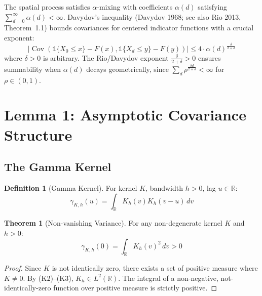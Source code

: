 \documentclass[final,3p,twocolumn,times,authoryear]{elsarticle}
\theoremstyle{definition}
\newtheorem{definition}{Definition}[section]
\newtheorem{theorem}{Theorem}[section]
\begin{document}
The spatial process satisfies $\alpha$-mixing with coefficients $\alpha(d)$ satisfying $\sum_{d=0}^\infty \alpha(d) < \infty$. Davydov's inequality (Davydov 1968; see also Rio 2013, Theorem~1.1) bounds covariances for centered indicator functions with a crucial exponent:
\begin{equation}
|\!\operatorname{Cov}(\mathbb{1}\{X_0 \leq x\} - F(x), \mathbb{1}\{X_d \leq y\} - F(y))\!| \leq 4 \cdot \alpha(d)^{\frac{\delta}{2+\delta}}
\end{equation}
where $\delta > 0$ is arbitrary. The Rio/Davydov exponent $\frac{\delta}{2+\delta} > 0$ ensures summability when $\alpha(d)$ decays geometrically, since $\sum_d \rho^{\frac{\delta d}{2+\delta}} < \infty$ for $\rho \in (0,1)$.

\section{Lemma 1: Asymptotic Covariance Structure}
\label{sec:lemma1}

\subsection{The Gamma Kernel}

\begin{definition}[Gamma Kernel]
\label{def:gamma-kernel}
For kernel $K$, bandwidth $h > 0$, lag $u \in \mathbb{R}$:
\begin{equation}
\gamma_{K,h}(u) = \int_{\mathbb{R}} K_h(v) K_h(v - u) \, dv
\end{equation}
\end{definition}

\begin{theorem}[Non-vanishing Variance]
\label{thm:nonvanish}
For any non-degenerate kernel $K$ and $h > 0$:
\begin{equation}
\gamma_{K,h}(0) = \int_{\mathbb{R}} K_h(v)^2 \, dv > 0
\end{equation}
\end{theorem}

\begin{proof}
Since $K$ is not identically zero, there exists a set of positive measure where $K \neq 0$. By (K2)--(K3), $K_h \in L^2(\mathbb{R})$. The integral of a non-negative, not-identically-zero function over positive measure is strictly positive.
\end{proof}
\end{document}

